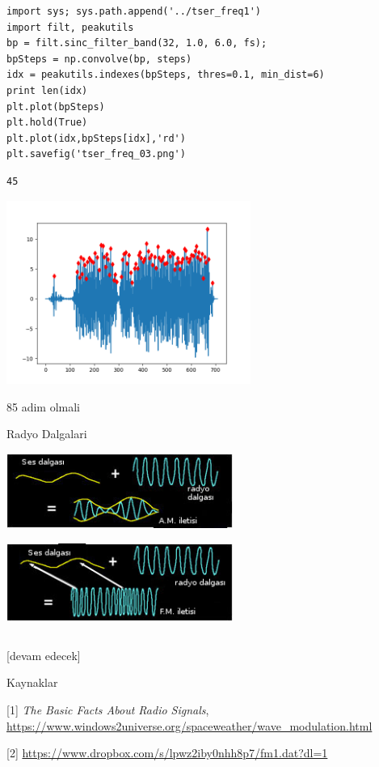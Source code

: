 \documentclass[12pt,fleqn]{article}\usepackage{../../common}
\begin{document}
\begin{verbatim}
import sys; sys.path.append('../tser_freq1')
import filt, peakutils
bp = filt.sinc_filter_band(32, 1.0, 6.0, fs);
bpSteps = np.convolve(bp, steps)
idx = peakutils.indexes(bpSteps, thres=0.1, min_dist=6)
print len(idx)
plt.plot(bpSteps)
plt.hold(True)
plt.plot(idx,bpSteps[idx],'rd')
plt.savefig('tser_freq_03.png')
\end{verbatim}

\begin{verbatim}
45
\end{verbatim}\includegraphics[height=6cm]{tser_freq_03.png}

85 adim olmali

Radyo Dalgalari

\includegraphics[width=20em]{AM_waves.jpg}

\includegraphics[width=20em]{FM_waves.jpg}

\inputminted[fontsize=\footnotesize]{python}{FMDemodulator.py}

[devam edecek]

Kaynaklar

[1] {\em The Basic Facts About Radio Signals}, \url{https://www.windows2universe.org/spaceweather/wave_modulation.html}

[2] \url{https://www.dropbox.com/s/lpwz2iby0nhh8p7/fm1.dat?dl=1}
\end{document}
